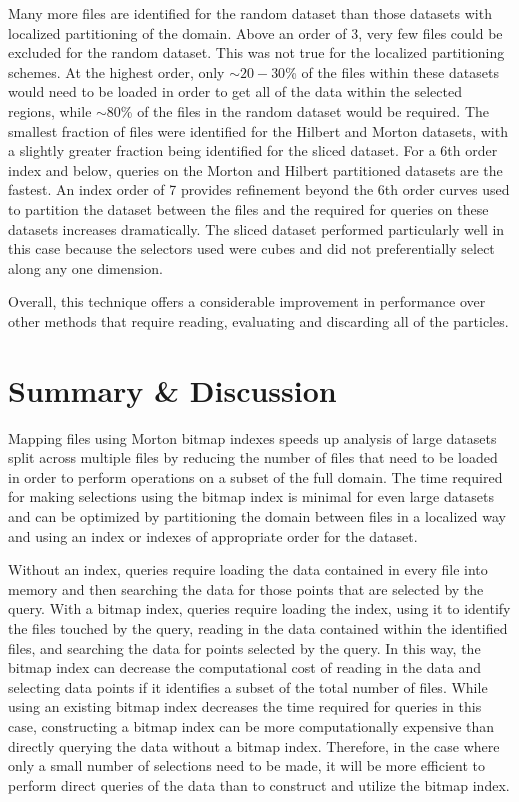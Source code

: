 \documentclass[apjl]{emulateapj}
\begin{document}
\fi
%

Many more files are identified for the random dataset than those datasets with localized partitioning of the domain. Above an order of 3, very few files could be excluded for the random dataset. This was not true for the localized partitioning schemes. At the highest order, only $\sim20-30$\% of the files within these datasets would need to be loaded in order to get all of the data within the selected regions, while $\sim80$\% of the files in the random dataset would be required. The smallest fraction of files were identified for the Hilbert and Morton datasets, with a slightly greater fraction being identified for the sliced dataset. For a 6th order index and below, queries on the Morton and Hilbert partitioned datasets are the fastest. An index order of 7 provides refinement beyond the 6th order curves used to partition the dataset between the files and the required for queries on these datasets increases dramatically. The sliced dataset performed particularly well in this case because the selectors used were cubes and did not preferentially select along any one dimension. 

Overall, this technique offers a considerable improvement in performance over other methods that require reading, evaluating and discarding all of the particles.

\section{Summary \& Discussion}\label{S:discuss}
Mapping files using Morton bitmap indexes speeds up analysis of large datasets split across multiple files by reducing the number of files that need to be loaded in order to perform operations on a subset of the full domain. The time required for making selections using the bitmap index is minimal for even large datasets and can be optimized by partitioning the domain between files in a localized way and using an index or indexes of appropriate order for the dataset. 

Without an index, queries require loading the data contained in every file into memory and then searching the data for those points that are selected by the query. With a bitmap index, queries require loading the index, using it to identify the files touched by the query, reading in the data contained within the identified files, and searching the data for points selected by the query. In this way, the bitmap index can decrease the computational cost of reading in the data and selecting data points if it identifies a subset of the total number of files. While using an existing bitmap index decreases the time required for queries in this case, constructing a bitmap index can be more computationally expensive than directly querying the data without a bitmap index. Therefore, in the case where only a small number of selections need to be made, it will be more efficient to perform direct queries of the data than to construct and utilize the bitmap index.
\end{document}
